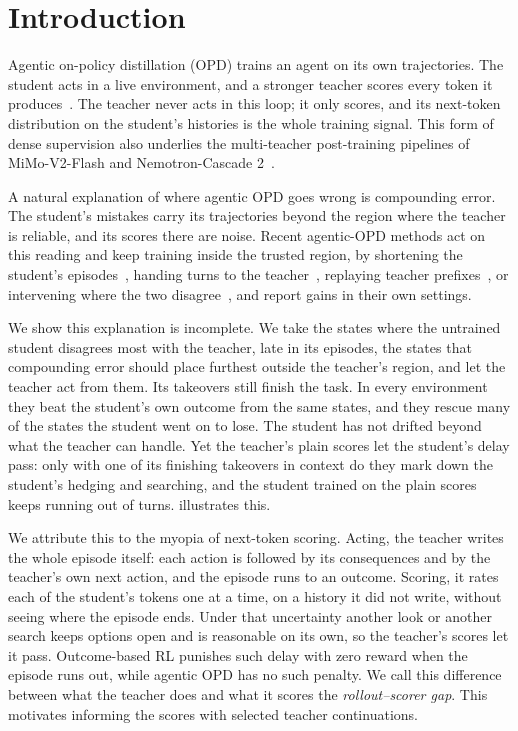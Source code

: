 \section{Introduction}
\label{sec:intro}

Agentic on-policy distillation (OPD) trains an agent on its own trajectories. The student acts in a live environment, and a stronger teacher scores every token it produces~\citep{reopd2026}. The teacher never acts in this loop; it only scores, and its next-token distribution on the student's histories is the whole training signal. This form of dense supervision also underlies the multi-teacher post-training pipelines of MiMo-V2-Flash and Nemotron-Cascade 2~\citep{mimo2026,nemotroncascade22026}.

A natural explanation of where agentic OPD goes wrong is compounding error. The student's mistakes carry its trajectories beyond the region where the teacher is reliable, and its scores there are noise. Recent agentic-OPD methods act on this reading and keep training inside the trusted region, by shortening the student's episodes~\citep{tcod2026}, handing turns to the teacher~\citep{guidedopd2026}, replaying teacher prefixes~\citep{reopd2026}, or intervening where the two disagree~\citep{futurebridge2026}, and report gains in their own settings.

We show this explanation is incomplete. We take the states where the untrained student disagrees most with the teacher, late in its episodes, the states that compounding error should place furthest outside the teacher's region, and let the teacher act from them. Its takeovers still finish the task. In every environment they beat the student's own outcome from the same states, and they rescue many of the states the student went on to lose.
The student has not drifted beyond what the teacher can handle. Yet the teacher's plain scores let the student's delay pass: only with one of its finishing takeovers in context do they mark down the student's hedging and searching, and the student trained on the plain scores keeps running out of turns.  illustrates this.



We attribute this to the myopia of next-token scoring. Acting, the teacher writes the whole episode itself: each action is followed by its consequences and by the teacher's own next action, and the episode runs to an outcome. Scoring, it rates each of the student's tokens one at a time, on a history it did not write, without seeing where the episode ends. Under that uncertainty another look or another search keeps options open and is reasonable on its own, so the teacher's scores let it pass. Outcome-based RL punishes such delay with zero reward when the episode runs out, while agentic OPD has no such penalty. We call this difference between what the teacher does and what it scores the \emph{rollout--scorer gap}. This motivates informing the scores with selected teacher continuations.

